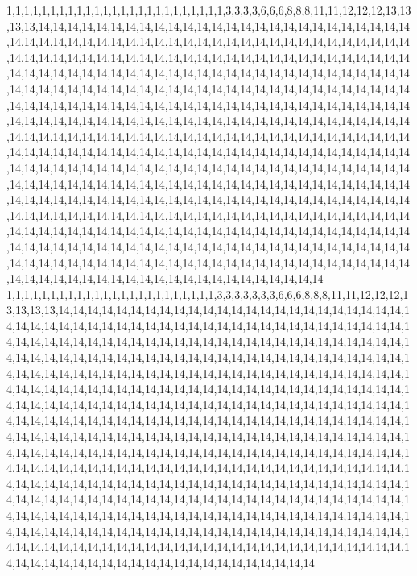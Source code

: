 1,1,1,1,1,1,1,1,1,1,1,1,1,1,1,1,1,1,1,1,1,1,1,1,1,3,3,3,3,6,6,6,8,8,8,11,11,12,12,12,13,13,13,13,14,14,14,14,14,14,14,14,14,14,14,14,14,14,14,14,14,14,14,14,14,14,14,14,14,14,14,14,14,14,14,14,14,14,14,14,14,14,14,14,14,14,14,14,14,14,14,14,14,14,14,14,14,14,14,14,14,14,14,14,14,14,14,14,14,14,14,14,14,14,14,14,14,14,14,14,14,14,14,14,14,14,14,14,14,14,14,14,14,14,14,14,14,14,14,14,14,14,14,14,14,14,14,14,14,14,14,14,14,14,14,14,14,14,14,14,14,14,14,14,14,14,14,14,14,14,14,14,14,14,14,14,14,14,14,14,14,14,14,14,14,14,14,14,14,14,14,14,14,14,14,14,14,14,14,14,14,14,14,14,14,14,14,14,14,14,14,14,14,14,14,14,14,14,14,14,14,14,14,14,14,14,14,14,14,14,14,14,14,14,14,14,14,14,14,14,14,14,14,14,14,14,14,14,14,14,14,14,14,14,14,14,14,14,14,14,14,14,14,14,14,14,14,14,14,14,14,14,14,14,14,14,14,14,14,14,14,14,14,14,14,14,14,14,14,14,14,14,14,14,14,14,14,14,14,14,14,14,14,14,14,14,14,14,14,14,14,14,14,14,14,14,14,14,14,14,14,14,14,14,14,14,14,14,14,14,14,14,14,14,14,14,14,14,14,14,14,14,14,14,14,14,14,14,14,14,14,14,14,14,14,14,14,14,14,14,14,14,14,14,14,14,14,14,14,14,14,14,14,14,14,14,14,14,14,14,14,14,14,14,14,14,14,14,14,14,14,14,14,14,14,14,14,14,14,14,14,14,14,14,14,14,14,14,14,14,14,14,14,14,14,14,14,14,14,14,14,14,14,14,14,14,14,14,14,14,14,14,14,14,14,14,14,14,14,14,14,14,14,14,14,14,14,14,14,14,14,14,14,14,14,14,14,14,14,14,14,14,14,14,14,14,14,14,14,14,14,14,14,14,14,14,14,14,14,14,14,14,14,14,14,14,14,14,14,14,14,14,14,14,14,14,14,14,14,14,14,14,14,14,14,14,14,14,14,14,14,14
1,1,1,1,1,1,1,1,1,1,1,1,1,1,1,1,1,1,1,1,1,1,1,1,3,3,3,3,3,3,3,6,6,6,8,8,8,11,11,12,12,12,13,13,13,13,14,14,14,14,14,14,14,14,14,14,14,14,14,14,14,14,14,14,14,14,14,14,14,14,14,14,14,14,14,14,14,14,14,14,14,14,14,14,14,14,14,14,14,14,14,14,14,14,14,14,14,14,14,14,14,14,14,14,14,14,14,14,14,14,14,14,14,14,14,14,14,14,14,14,14,14,14,14,14,14,14,14,14,14,14,14,14,14,14,14,14,14,14,14,14,14,14,14,14,14,14,14,14,14,14,14,14,14,14,14,14,14,14,14,14,14,14,14,14,14,14,14,14,14,14,14,14,14,14,14,14,14,14,14,14,14,14,14,14,14,14,14,14,14,14,14,14,14,14,14,14,14,14,14,14,14,14,14,14,14,14,14,14,14,14,14,14,14,14,14,14,14,14,14,14,14,14,14,14,14,14,14,14,14,14,14,14,14,14,14,14,14,14,14,14,14,14,14,14,14,14,14,14,14,14,14,14,14,14,14,14,14,14,14,14,14,14,14,14,14,14,14,14,14,14,14,14,14,14,14,14,14,14,14,14,14,14,14,14,14,14,14,14,14,14,14,14,14,14,14,14,14,14,14,14,14,14,14,14,14,14,14,14,14,14,14,14,14,14,14,14,14,14,14,14,14,14,14,14,14,14,14,14,14,14,14,14,14,14,14,14,14,14,14,14,14,14,14,14,14,14,14,14,14,14,14,14,14,14,14,14,14,14,14,14,14,14,14,14,14,14,14,14,14,14,14,14,14,14,14,14,14,14,14,14,14,14,14,14,14,14,14,14,14,14,14,14,14,14,14,14,14,14,14,14,14,14,14,14,14,14,14,14,14,14,14,14,14,14,14,14,14,14,14,14,14,14,14,14,14,14,14,14,14,14,14,14,14,14,14,14,14,14,14,14,14,14,14,14,14,14,14,14,14,14,14,14,14,14,14,14,14,14,14,14,14,14,14,14,14,14,14,14,14,14,14,14,14,14,14,14,14,14,14,14,14,14,14,14,14,14,14,14,14,14,14,14,14,14,14,14,14,14,14,14,14,14,14,14,14,14,14,14,14,14,14
